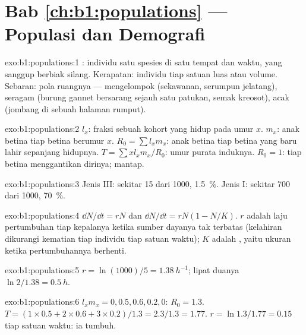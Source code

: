 \section*{Bab \ref{ch:b1:populations} --- Populasi dan Demografi}

\begin{solution}{exo:b1:populations:1}
: individu satu spesies di satu tempat dan waktu, yang sanggup
berbiak silang. Kerapatan: individu tiap satuan luas atau volume.
Sebaran: pola ruangnya --- mengelompok (sekawanan, serumpun jelatang),
seragam (burung gannet bersarang sejauh satu patukan, semak kreosot),
acak (jombang di sebuah halaman rumput).
\end{solution}

\begin{solution}{exo:b1:populations:2}
$l_x$: fraksi sebuah kohort yang hidup pada umur $x$. $m_x$: anak
betina tiap betina berumur $x$. $R_0 = \sum l_x m_x$: anak betina tiap
betina yang baru lahir sepanjang hidupnya. $T = \sum x l_x m_x / R_0$:
umur purata induknya. $R_0 = 1$: tiap betina menggantikan dirinya;
 mantap.
\end{solution}

\begin{solution}{exo:b1:populations:3}
Jenis III: sekitar 15 dari 1000, \qty{1.5}{\%}. Jenis I: sekitar 700 dari
1000, \qty{70}{\%}.
\end{solution}

\begin{solution}{exo:b1:populations:4}
$\dd N/\dd t = rN$ dan $\dd N/\dd t = rN(1 - N/K)$. $r$ adalah laju
pertumbuhan tiap kepalanya ketika sumber dayanya tak terbatas
(kelahiran dikurangi kematian tiap individu tiap satuan waktu); $K$
adalah , yaitu ukuran ketika pertumbuhannya berhenti.
\end{solution}

\begin{solution}{exo:b1:populations:5}
$r = \ln(1000)/5 = \qty{1.38}{h^{-1}}$; lipat duanya $\ln 2/1.38 =
\qty{0.5}{h}$.
\end{solution}

\begin{solution}{exo:b1:populations:6}
$l_x m_x = 0, 0.5, 0.6, 0.2, 0$: $R_0 = 1.3$. $T = (1\times 0.5 +
2\times 0.6 + 3\times 0.2)/1.3 = 2.3/1.3 = 1.77$. $r = \ln 1.3/1.77 =
\qty{0.15}{}$ tiap satuan waktu: ia tumbuh.
\end{solution}

